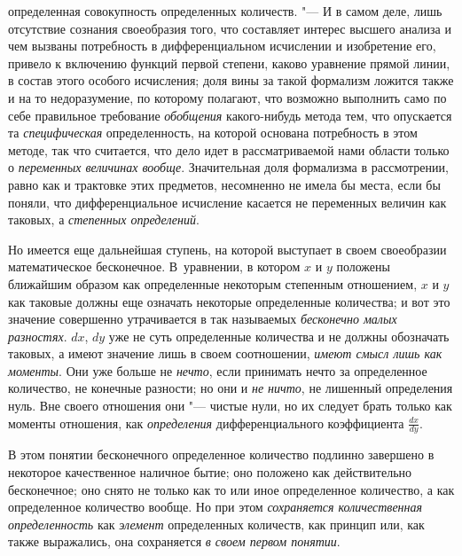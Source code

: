 определенная совокупность определенных количеств. "--- И в самом деле, лишь
отсутствие сознания своеобразия того, что составляет интерес высшего
анализа и чем вызваны потребность в дифференциальном исчислении и
изобретение его, привело к включению функций первой степени, каково
уравнение прямой линии, в состав этого особого исчисления; доля вины за
такой формализм ложится также и на то недоразумение, по которому полагают,
что возможно выполнить само по себе правильное требование
{\em обобщения} какого-нибудь метода тем, что
опускается та {\em специфическая} определенность, на
которой основана потребность в этом методе, так что считается, что дело
идет в рассматриваемой нами области только о
{\em переменных величинах вообще}. Значительная доля
формализма в рассмотрении, равно как и трактовке этих предметов, несомненно
не имела бы места, если бы поняли, что дифференциальное исчисление касается
не переменных величин как таковых, а {\em степенных
определений}.

Но имеется еще дальнейшая ступень, на которой выступает в своем своеобразии
математическое бесконечное. В~уравнении, в котором
$x$ и $y$ положены
ближайшим образом как определенные некоторым степенным отношением,
$x$ и $y$ как таковые
должны еще означать некоторые определенные количества; и вот это значение
совершенно утрачивается в так называемых
{\em бесконечно малых разностях}.
$dx$, $dy$ уже не суть
определенные количества и не должны обозначать таковых, а имеют значение
лишь в своем соотношении, {\em имеют смысл лишь как
моменты}. Они уже больше не {\em нечто}, если
принимать нечто за определенное количество, не конечные разности; но
они и {\em не ничто}, не лишенный определения нуль. Вне
своего отношения они "--- чистые нули, но их следует брать только как моменты
отношения, как {\em определения} дифференциального
коэффициента $\frac{dx}{dy}$.

В этом понятии бесконечного определенное количество подлинно завершено в
некоторое качественное наличное бытие; оно положено как действительно
бесконечное; оно снято не только как то или иное определенное количество, а
как определенное количество вообще. Но при этом
{\em сохраняется количественная определенность} как
{\em элемент} определенных количеств, как принцип или,
как также выражались, она сохраняется {\em в своем
первом понятии}.

